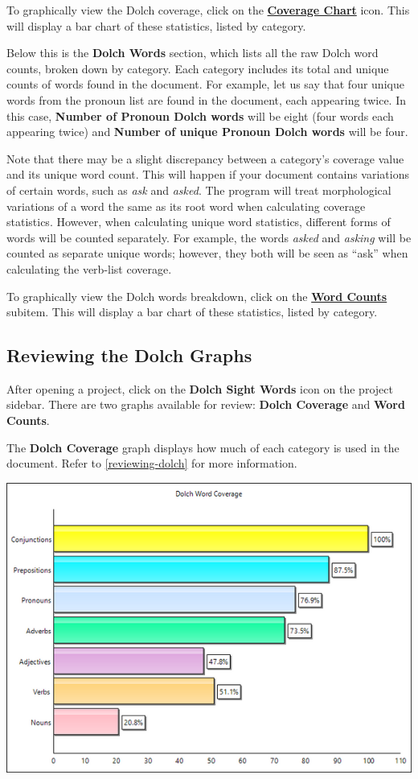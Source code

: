 \documentclass[
]{book}
\theoremstyle{definition}
\theoremstyle{definition}
\theoremstyle{definition}
\theoremstyle{definition}
\theoremstyle{remark}
\begin{document}
To graphically view the Dolch coverage, click on the \protect\hyperlink{reviewing-dolch-graphs}{\textbf{Coverage Chart}} icon. This will display a bar chart of these statistics, listed by category.

Below this is the \textbf{Dolch Words} section, which lists all the raw Dolch word counts, broken down by category. Each category includes its total and unique counts of words found in the document. For example, let us say that four unique words from the pronoun list are found in the document, each appearing twice. In this case, \textbf{Number of Pronoun Dolch words} will be eight (four words each appearing twice) and \textbf{Number of unique Pronoun Dolch words} will be four.

Note that there may be a slight discrepancy between a category's coverage value and its unique word count. This will happen if your document contains variations of certain words, such as \emph{ask} and \emph{asked}. The program will treat morphological variations of a word the same as its root word when calculating coverage statistics. However, when calculating unique word statistics, different forms of words will be counted separately. For example, the words \emph{asked} and \emph{asking} will be counted as separate unique words; however, they both will be seen as ``ask'' when calculating the verb-list coverage.

To graphically view the Dolch words breakdown, click on the \protect\hyperlink{reviewing-dolch-graphs}{\textbf{Word Counts}} subitem. This will display a bar chart of these statistics, listed by category.

\hypertarget{reviewing-dolch-graphs}{%
\subsection*{Reviewing the Dolch Graphs}\label{reviewing-dolch-graphs}}

After opening a project, click on the \textbf{Dolch Sight Words} icon on the project sidebar. There are two graphs available for review: \textbf{Dolch Coverage} and \textbf{Word Counts}.

The \textbf{Dolch Coverage} graph displays how much of each category is used in the document. Refer to \ref{reviewing-dolch} for more information.

\begin{center}\includegraphics[width=0.75\linewidth,]{Images/DolchCoverageChart} \end{center}
\end{document}
